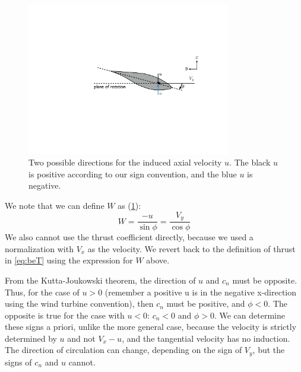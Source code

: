\documentclass{article}
\begin{document}
\begin{figure}[htbp]
    \centering
    \includegraphics[width=3.5in]{figures/inflow4}
    \caption{Two possible directions for the induced axial velocity $u$.  The black $u$ is positive according to our sign convention, and the blue $u$ is negative.}
    \label{fig:inflowu}
\end{figure}

We note that we can define $W$ as (\cref{fig:inflowu}):
\begin{equation}
    W = \frac{-u}{\sin\phi} = \frac{V_y}{\cos\phi}
\end{equation}
We also cannot use the thrust coefficient directly, because we used a normalization with $V_x$ as the velocity.  We revert back to the definition of thrust in \cref{eq:beT} using the expression for $W$ above.

From the Kutta-Joukowski theorem, the direction of $u$ and $c_n$ must be opposite.  Thus, for the case of $u > 0$ (remember a positive u is in the negative x-direction using the wind turbine convention), then $c_n$ must be positive, and $\phi < 0$.  The opposite is true for the case with $u < 0$: $c_n < 0$ and $\phi > 0$.  We can determine these signs a priori, unlike the more general case, because the velocity is strictly determined by $u$ and not $V_x - u$, and the tangential velocity has no induction.  The direction of circulation can change, depending on the sign of $V_y$, but the signs of $c_n$ and $u$ cannot.


\end{document}
